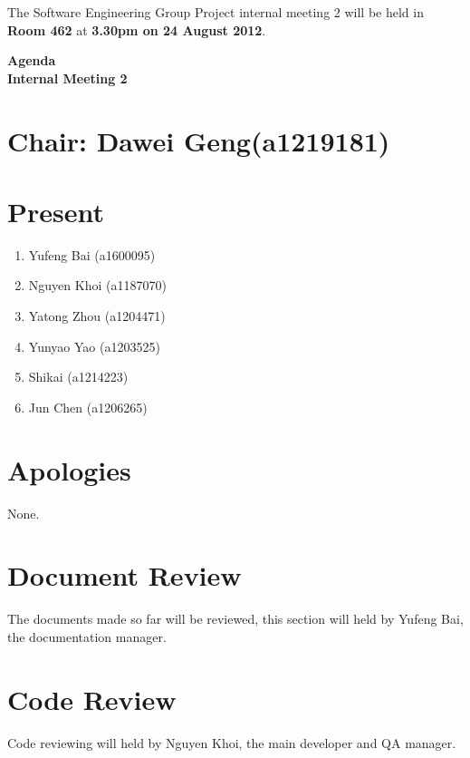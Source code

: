 \documentclass[11pt, a4paper]{article}
\begin{document}
\noindent The Software Engineering Group Project internal meeting 2 will be held in {\bf Room 462} at {\bf 3.30pm on 24 August 2012}.


\vspace*{15pt}

\begin{center}
\huge \bf Agenda \\Internal Meeting 2
\end{center}



\section*{Chair: Dawei Geng(a1219181)}
\section*{Present}
\begin{enumerate}
\item Yufeng Bai (a1600095)
\item Nguyen Khoi (a1187070)
\item Yatong Zhou (a1204471)
\item Yunyao Yao (a1203525)
\item Shikai (a1214223)
\item Jun Chen (a1206265)
\end{enumerate}
\section{Apologies}
None.

\section{Document Review}
The documents made so far will be reviewed, this section will held by Yufeng Bai, the documentation manager.

\section{Code Review}
Code reviewing will held by Nguyen Khoi, the main developer and QA manager.
\end{document}
